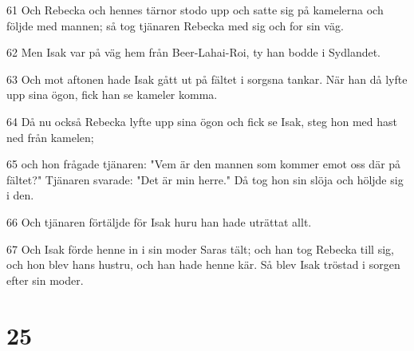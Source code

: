 \par 61 Och Rebecka och hennes tärnor stodo upp och satte sig på kamelerna och följde med mannen; så tog tjänaren Rebecka med sig och for sin väg.
\par 62 Men Isak var på väg hem från Beer-Lahai-Roi, ty han bodde i Sydlandet.
\par 63 Och mot aftonen hade Isak gått ut på fältet i sorgsna tankar. När han då lyfte upp sina ögon, fick han se kameler komma.
\par 64 Då nu också Rebecka lyfte upp sina ögon och fick se Isak, steg hon med hast ned från kamelen;
\par 65 och hon frågade tjänaren: "Vem är den mannen som kommer emot oss där på fältet?" Tjänaren svarade: "Det är min herre." Då tog hon sin slöja och höljde sig i den.
\par 66 Och tjänaren förtäljde för Isak huru han hade uträttat allt.
\par 67 Och Isak förde henne in i sin moder Saras tält; och han tog Rebecka till sig, och hon blev hans hustru, och han hade henne kär. Så blev Isak tröstad i sorgen efter sin moder.

\chapter{25}


